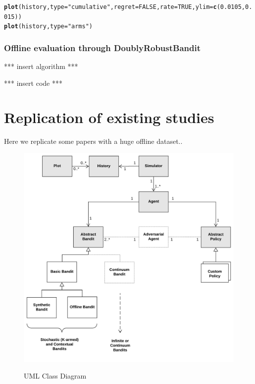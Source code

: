 \documentclass[nojss]{jss}\usepackage[]{graphicx}\usepackage[]{color}
\makeatletter
\newcommand{\hlnum}[1]{\textcolor[rgb]{0.686,0.059,0.569}{#1}}%
\newcommand{\hlstr}[1]{\textcolor[rgb]{0.192,0.494,0.8}{#1}}%
\newcommand{\hlstd}[1]{\textcolor[rgb]{0.345,0.345,0.345}{#1}}%
\newcommand{\hlkwc}[1]{\textcolor[rgb]{0.333,0.667,0.333}{#1}}%
\newcommand{\hlkwd}[1]{\textcolor[rgb]{0.737,0.353,0.396}{\textbf{#1}}}%
\newenvironment{kframe}{%
 \def\at@end@of@kframe{}%
 \ifinner\ifhmode%
  \def\at@end@of@kframe{\end{minipage}}%
  \begin{minipage}{\columnwidth}%
 \fi\fi%
 \def\FrameCommand##1{\hskip\@totalleftmargin \hskip-\fboxsep
 \colorbox{shadecolor}{##1}\hskip-\fboxsep
     \hskip-\linewidth \hskip-\@totalleftmargin \hskip\columnwidth}%
 \MakeFramed {\advance\hsize-\width
   \@totalleftmargin\z@ \linewidth\hsize
   \@setminipage}}%
 {\par\unskip\endMakeFramed%
 \at@end@of@kframe}
\newenvironment{knitrout}{}{} %
\makeatother
\begin{document}
\begin{knitrout}
\begin{kframe}
\begin{alltt}
\hlkwd{plot}\hlstd{(history,} \hlkwc{type} \hlstd{=} \hlstr{"cumulative"}\hlstd{,} \hlkwc{regret} \hlstd{=} \hlnum{FALSE}\hlstd{,} \hlkwc{rate} \hlstd{=} \hlnum{TRUE}\hlstd{,} \hlkwc{ylim} \hlstd{=} \hlkwd{c}\hlstd{(}\hlnum{0.0105}\hlstd{,}\hlnum{0.015}\hlstd{))}
\hlkwd{plot}\hlstd{(history,} \hlkwc{type} \hlstd{=} \hlstr{"arms"}\hlstd{)}
\end{alltt}
\end{kframe}
\end{knitrout}

\subsubsection{Offline evaluation through DoublyRobustBandit}



*** insert algorithm ***


*** insert code ***

\section{Replication of existing studies}

Here we replicate some papers with a huge offline dataset..

\begin{figure}[H]
  \centering
    \includegraphics[width=.99\textwidth]{fig/contextual_class}
    \label{fig:contextual_class}
      \caption{ UML Class Diagram}
\end{figure}
\end{document}
